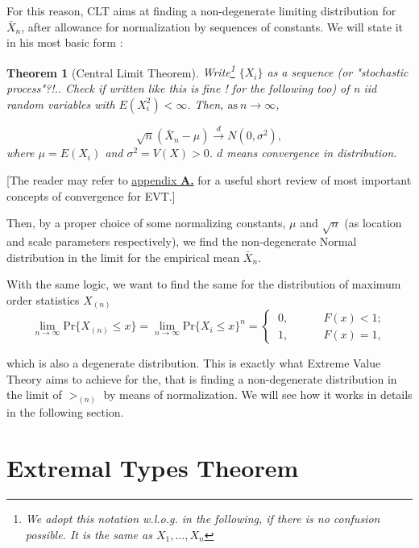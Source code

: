 \documentclass[11pt,a4paper,openany ]{book}
\newtheorem{exe}{Theorem}
\begin{document}
For this reason, CLT aims at finding a non-degenerate limiting distribution for $\bar{X}_n$, after allowance for normalization by sequences of constants. We will state it in his most basic form :

\begin{exe}[Central Limit Theorem] 
	Write\footnote{We adopt this notation w.l.o.g. in the following, if there is no confusion possible. It is the same as $X_1,\dots,X_n$} $\{X_i\}$ as a sequence \emph{(or "stochastic process"?!.. Check if written like this is fine ! for the following too)}  of n iid random variables with $E(X^2_i)<\infty$. Then, $\text{as} \ n\rightarrow\infty$,
	
	\begin{equation*}
	\sqrt{n}(\bar{X}_n-\mu)\stackrel{d}{\longrightarrow}N(0,\sigma^2),
	\end{equation*}
	where $\mu=E(X_i)$ and $\sigma^2=V(X)>0$. $d$ means convergence in distribution.
\end{exe}
[The reader may refer to \hyperref[convconc]{appendix\textbf{ A.}} for a useful short review of most important concepts of convergence for EVT.]

Then, by a proper choice of some normalizing constants, $\mu$ and $\sqrt{n}$ (as location and scale parameters respectively), we find the non-degenerate Normal distribution in the limit for the empirical mean $\bar{X}_n$. 

With the same logic, we want to find the same for the distribution of maximum order statistics $X_{(n)}$ 
\begin{equation}
\displaystyle{\lim_{n \to \infty}}\text{Pr}\big\{X_{(n)}\leq x\big\}=\displaystyle{\lim_{n \to \infty}}\text{Pr}\big\{X_i\leq x\big\}^n=\begin{cases}
\ 0, \ \ \ \ \ \ \ \ \ \ \  \ \ \ F(x)<1; \\ 
\ 1, \ \ \ \ \ \ \ \ \ \ \ \  \ \ F(x)=1,
\end{cases}
\end{equation}

which is also a degenerate distribution.
This is exactly what Extreme Value Theory aims to achieve for the, that is finding a non-degenerate distribution in the limit of $>_{(n)}$ by means of normalization. We will see how it works in details in the following section.


\section{Extremal Types Theorem}\label{sec:extrtypethm}
\end{document}
